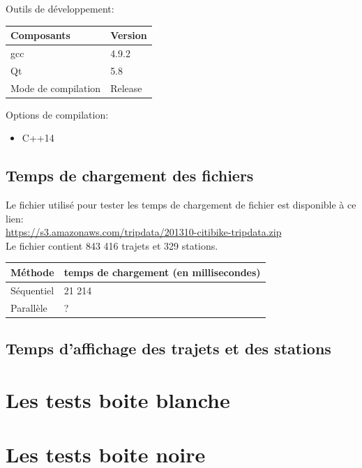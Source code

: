 \documentclass[12pt]{article}
\begin{document}
	    Outils de développement: \\
	    \begin{center}
			\begin{tabular}{| l | l |}
			\hline
			\textbf{Composants} & \textbf{Version} \\ \hline
			gcc & 4.9.2 \\ \hline
			Qt & 5.8 \\ \hline
			Mode de compilation & Release \\ \hline
		    \end{tabular}
	    \end{center}
	    
	    Options de compilation:\\
	    \begin{itemize}
	    \item C++14
	    \end{itemize}
	    
		\subsection{Temps de chargement des fichiers}
		Le fichier utilisé pour tester les temps de chargement de fichier est disponible à ce lien:\\
		\url{https://s3.amazonaws.com/tripdata/201310-citibike-tripdata.zip}\\
		
		Le fichier contient 843 416 trajets et 329 stations.\\
		\begin{center}
			\begin{tabular}{| l | l |}
			\hline
			\textbf{Méthode} & \textbf{temps de chargement (en millisecondes)} \\ \hline
			Séquentiel & 21 214 \\ \hline
			Parallèle & ? \\ \hline
		    \end{tabular}
	    \end{center}
		
		\subsection{Temps d'affichage des trajets et des stations}
		
	\section{Les tests boite blanche}
	\section{Les tests boite noire}
\end{document}
